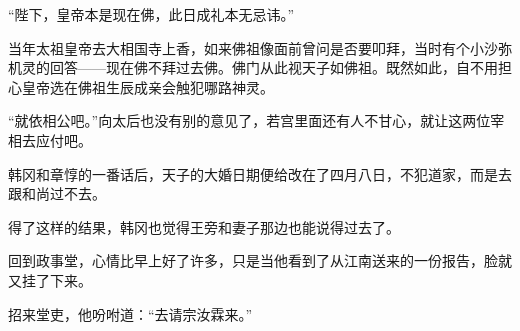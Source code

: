 “陛下，皇帝本是现在佛，此日成礼本无忌讳。”

当年太祖皇帝去大相国寺上香，如来佛祖像面前曾问是否要叩拜，当时有个小沙弥机灵的回答——现在佛不拜过去佛。佛门从此视天子如佛祖。既然如此，自不用担心皇帝选在佛祖生辰成亲会触犯哪路神灵。

“就依相公吧。”向太后也没有别的意见了，若宫里面还有人不甘心，就让这两位宰相去应付吧。

韩冈和章惇的一番话后，天子的大婚日期便给改在了四月八日，不犯道家，而是去跟和尚过不去。

得了这样的结果，韩冈也觉得王旁和妻子那边也能说得过去了。

回到政事堂，心情比早上好了许多，只是当他看到了从江南送来的一份报告，脸就又挂了下来。

招来堂吏，他吩咐道：“去请宗汝霖来。”
